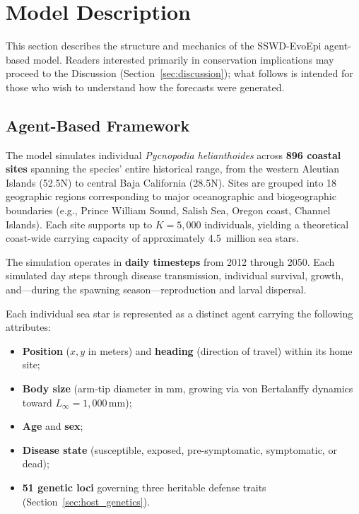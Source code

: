 
\section{Model Description}
\label{sec:model}

This section describes the structure and mechanics of the SSWD-EvoEpi
agent-based model.  Readers interested primarily in conservation
implications may proceed to the Discussion (Section~\ref{sec:discussion});
what follows is intended for those who wish to understand how the
forecasts were generated.

\subsection{Agent-Based Framework}
\label{sec:abm_framework}

The model simulates individual \textit{Pycnopodia helianthoides} across
\textbf{896 coastal sites} spanning the species' entire historical range,
from the western Aleutian Islands (52.5\textdegree N) to central Baja
California (28.5\textdegree N).  Sites are grouped into 18 geographic
regions corresponding to major oceanographic and biogeographic boundaries
(e.g., Prince William Sound, Salish Sea, Oregon coast, Channel Islands).
Each site supports up to $K = 5{,}000$ individuals, yielding a theoretical
coast-wide carrying capacity of approximately 4.5~million sea stars.

The simulation operates in \textbf{daily timesteps} from 2012 through 2050.
Each simulated day steps through disease transmission, individual survival,
growth, and---during the spawning season---reproduction and larval dispersal.

Each individual sea star is represented as a distinct agent carrying the
following attributes:
\begin{itemize}
  \item \textbf{Position} ($x, y$ in meters) and \textbf{heading}
        (direction of travel) within its home site;
  \item \textbf{Body size} (arm-tip diameter in mm, growing via von
        Bertalanffy dynamics toward $L_\infty = 1{,}000$\,mm);
  \item \textbf{Age} and \textbf{sex};
  \item \textbf{Disease state} (susceptible, exposed, pre-symptomatic,
        symptomatic, or dead);
  \item \textbf{51 genetic loci} governing three heritable defense traits
        (Section~\ref{sec:host_genetics}).
\end{itemize}

